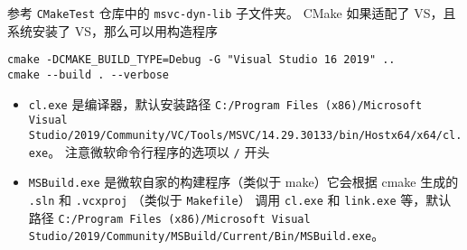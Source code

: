 
参考 \verb`CMakeTest` 仓库中的 \verb`msvc-dyn-lib` 子文件夹。 CMake 如果适配了 VS，且系统安装了 VS，那么可以用构造程序
\begin{lstlisting}[language=none]
cmake -DCMAKE_BUILD_TYPE=Debug -G "Visual Studio 16 2019" ..
cmake --build . --verbose
\end{lstlisting}

\begin{itemize}
\item \verb`cl.exe` 是编译器，默认安装路径 \verb`C:/Program Files (x86)/Microsoft Visual Studio/2019/Community/VC/Tools/MSVC/14.29.30133/bin/Hostx64/x64/cl.exe`。 注意微软命令行程序的选项以 \verb`/` 开头
\item \verb`MSBuild.exe` 是微软自家的构建程序（类似于 make）它会根据 cmake 生成的 \verb`.sln` 和 \verb`.vcxproj` （类似于 \verb`Makefile`） 调用 \verb`cl.exe` 和 \verb`link.exe` 等，默认路径 \verb`C:/Program Files (x86)/Microsoft Visual Studio/2019/Community/MSBuild/Current/Bin/MSBuild.exe`。
\end{itemize}
